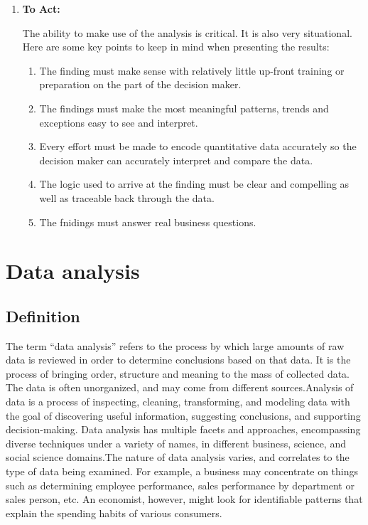\documentclass[a4paper,12pt,oneside]{report}
\begin{document}
{\begin{enumerate}
{makers. A detailed discussion on analytic maturity can be found in Data Science Maturity within an Organization. In addition to consuming the greatest effort, the Analyze activity is by far the most complex. The tradecraft of Data Science is an
art.}
\item \textbf {To Act:} {The ability to make use of the analysis is critical. It is also very situational. Here are some key points to keep in mind when presenting the results:\\
\begin{enumerate}
\item{The finding must make sense with relatively little up-front training or preparation on the part of the decision maker.}
\item{The findings must make the most meaningful patterns, trends and exceptions easy to see and interpret.}
\item{Every effort must be made to encode quantitative data accurately so the decision maker can accurately interpret and compare the data.}
\item{The logic used to arrive at the finding must be clear and compelling as well as traceable back through the data.}
\item{The fnidings must answer real business questions.}
\end{enumerate} }
\end{enumerate}
\section{Data analysis}
\subsection{Definition}
{      The term “data analysis” refers to the process by which large amounts of raw data is reviewed in order to determine conclusions based on that data. It is the process of bringing order, structure and meaning to the mass of collected data. The data is often unorganized, and may come from different sources.Analysis of data is a process of inspecting, cleaning, transforming, and modeling data with the goal of discovering useful information, suggesting conclusions, and supporting decision-making. Data analysis has multiple facets and approaches, encompassing diverse techniques under a variety of names, in different business, science, and social science domains.The nature of data analysis varies, and correlates to the type of data being examined. For example, a business may concentrate on things such as determining employee performance, sales performance by department or sales person, etc. An economist, however, might look for identifiable patterns that explain the spending habits of various consumers.}
}
\end{document}
